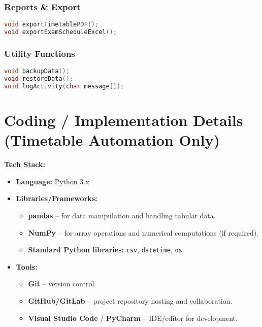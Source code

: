 \documentclass[12pt]{article}
\begin{document}
\subsubsection{Reports \& Export}
\begin{lstlisting}[language=C]
void exportTimetablePDF();
void exportExamScheduleExcel();
\end{lstlisting}

\subsubsection{Utility Functions}
\begin{lstlisting}[language=C]
void backupData();
void restoreData();
void logActivity(char message[]);
\end{lstlisting}

\section{Coding / Implementation Details (Timetable Automation Only)}

\textbf{Tech Stack:}

\begin{itemize}
    \item \textbf{Language:} Python 3.x
    \item \textbf{Libraries/Frameworks:}
    \begin{itemize}
        \item \textbf{pandas} – for data manipulation and handling tabular data.
        \item \textbf{NumPy} – for array operations and numerical computations (if required).
        \item \textbf{Standard Python libraries:} \texttt{csv}, \texttt{datetime}, \texttt{os}.
    \end{itemize}
    \item \textbf{Tools:}
    \begin{itemize}
        \item \textbf{Git} – version control.
        \item \textbf{GitHub/GitLab} – project repository hosting and collaboration.
        \item \textbf{Visual Studio Code} / \textbf{PyCharm} – IDE/editor for development.
    \end{itemize}
\end{itemize}
\end{document}
